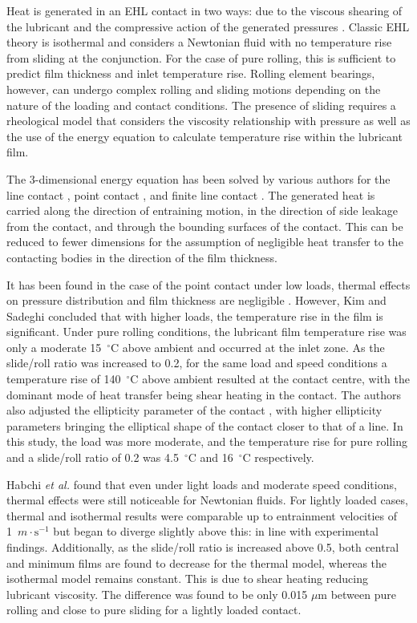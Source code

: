 Heat is generated in an EHL contact in two ways: due to the viscous shearing of the lubricant and the compressive action of the generated pressures \cite{Mohammadpour2015c}. Classic EHL theory is isothermal and considers a Newtonian fluid with no temperature rise from sliding at the conjunction. For the case of pure rolling, this is sufficient to predict film thickness and inlet temperature rise. Rolling element bearings, however, can undergo complex rolling and sliding motions depending on the nature of the loading and contact conditions. The presence of sliding requires a rheological model that considers the viscosity relationship with pressure as well as the use of the energy equation to calculate temperature rise within the lubricant film.

The 3-dimensional energy equation has been solved by various authors for the line contact \cite{Yang2001}, point contact \cite{Kim1993},\cite{Kim1993a} and finite line contact \cite{Liu2002}. The generated heat is carried along the direction of entraining motion, in the direction of side leakage from the contact, and through the bounding surfaces of the contact. This can be reduced to fewer dimensions for the assumption of negligible heat transfer to the contacting bodies in the direction of the film thickness.

It has been found in the case of the point contact under low loads, thermal effects on pressure distribution and film thickness are negligible \cite{ZhuDong1984}. However, Kim and Sadeghi \cite{Kim1993} concluded that with higher loads, the temperature rise in the film is significant. Under pure rolling conditions, the lubricant film temperature rise was only a moderate 15~${ }^{\circ}\mathrm{C}$ above ambient and occurred at the inlet zone. As the slide/roll ratio was increased to 0.2, for the same load and speed conditions a temperature rise of 140~${ }^{\circ}\mathrm{C}$ above ambient resulted at the contact centre, with the dominant mode of heat transfer being shear heating in the contact. The authors also adjusted the ellipticity parameter of the contact \cite{Kim1993a}, with higher ellipticity parameters bringing the elliptical shape of the contact closer to that of a line. In this study, the load was more moderate, and the temperature rise for pure rolling and a slide/roll ratio of 0.2 was 4.5~${ }^{\circ}\mathrm{C}$ and 16~${ }^{\circ}\mathrm{C}$ respectively.

Habchi \textit{et al.} \cite{Habchi2008} found that even under light loads and moderate speed conditions, thermal effects were still noticeable for Newtonian fluids. For lightly loaded cases, thermal and isothermal results were comparable up to entrainment velocities of 1~$m \cdot \mathrm{s}^{-1}$ but began to diverge slightly above this: in line with experimental findings. Additionally, as the slide/roll ratio is increased above 0.5, both central and minimum films are found to decrease for the thermal model, whereas the isothermal model remains constant. This is due to shear heating reducing lubricant viscosity. The difference was found to be only 0.015 $\mu \mathrm{m}$ between pure rolling and close to pure sliding for a lightly loaded contact.

